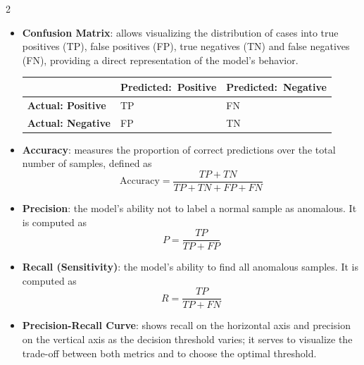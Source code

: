 \documentclass[11pt]{article}
\begin{document}
\begin{multicols}{2}
\vspace{-0.5em}
\setlength{\itemsep}{0.2em}
\begin{itemize}
     \item \textbf{Confusion Matrix}: allows visualizing the distribution of cases into true positives (TP), false positives (FP), true negatives (TN) and false negatives (FN), providing a direct representation of the model's behavior.
    \begin{table}[H]
    \centering
    \scriptsize
    \label{tab:confusion_example}
    \begin{tabular}{|l|p{1.45cm}|p{1.45cm}|}
        \hline
         & \textbf{Predicted:\ Positive} & \textbf{Predicted:\ Negative} \\ \hline
        \textbf{Actual: Positive} & TP & FN \\ \hline
        \textbf{Actual: Negative} & FP & TN \\ \hline
    \end{tabular}
    \end{table}

    \item \textbf{Accuracy}: measures the proportion of correct predictions over the total number of samples, defined as
    \begin{equation}
        \textstyle \text{Accuracy} = \frac{TP + TN}{TP + TN + FP + FN} \label{accuracy}
    \end{equation}

    \item \textbf{Precision}: the model's ability not to label a normal sample as anomalous. It is computed as
    \vspace{-0.5em}
    \begin{equation}
        \textstyle P = \frac{TP}{TP + FP}
    \end{equation}

    \item \textbf{Recall (Sensitivity)}: the model's ability to find all anomalous samples. It is computed as
    \vspace{-0.5em}
    \begin{equation}
        \textstyle R = \frac{TP}{TP + FN}
    \end{equation}

    \item \textbf{Precision-Recall Curve}: shows recall on the horizontal axis and precision on the vertical axis as the decision threshold varies; it serves to visualize the trade-off between both metrics and to choose the optimal threshold.


\end{itemize}
\end{multicols}
\end{document}
